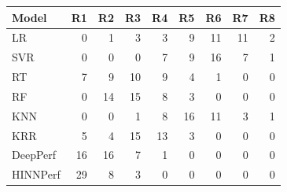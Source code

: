 \begin{tabular}{lrrrrrrrr}
\toprule
Model & R1 & R2 & R3 & R4 & R5 & R6 & R7 & R8 \\
\midrule
LR & 0 & 1 & 3 & 3 & 9 & 11 & 11 & 2 \\
SVR & 0 & 0 & 0 & 7 & 9 & 16 & 7 & 1 \\
RT & 7 & 9 & 10 & 9 & 4 & 1 & 0 & 0 \\
RF & 0 & 14 & 15 & 8 & 3 & 0 & 0 & 0 \\
KNN & 0 & 0 & 1 & 8 & 16 & 11 & 3 & 1 \\
KRR & 5 & 4 & 15 & 13 & 3 & 0 & 0 & 0 \\
DeepPerf & 16 & 16 & 7 & 1 & 0 & 0 & 0 & 0 \\
HINNPerf & 29 & 8 & 3 & 0 & 0 & 0 & 0 & 0 \\
\bottomrule
\end{tabular}
